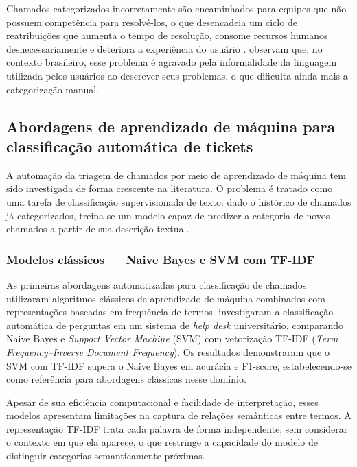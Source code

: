 \documentclass[
    12pt,                %
    openright,           %
    oneside,             %
    a4paper,             %
    english,             %
    brazil               %
]{abntex2}
\begin{document}
Chamados categorizados incorretamente são encaminhados para equipes que não possuem competência para resolvê-los, o que desencadeia um ciclo de reatribuições que aumenta o tempo de resolução, consome recursos humanos desnecessariamente e deteriora a experiência do usuário \cite{harun2023}.  observam que, no contexto brasileiro, esse problema é agravado pela informalidade da linguagem utilizada pelos usuários ao descrever seus problemas, o que dificulta ainda mais a categorização manual.

\subsection{Abordagens de aprendizado de máquina para classificação automática de tickets}
\label{subsec:helpdesk_ml}

A automação da triagem de chamados por meio de aprendizado de máquina tem sido investigada de forma crescente na literatura. O problema é tratado como uma tarefa de classificação supervisionada de texto: dado o histórico de chamados já categorizados, treina-se um modelo capaz de predizer a categoria de novos chamados a partir de sua descrição textual.

\subsubsection{Modelos clássicos — Naive Bayes e SVM com TF-IDF}
\label{subsubsec:helpdesk_classicos}

As primeiras abordagens automatizadas para classificação de chamados utilizaram algoritmos clássicos de aprendizado de máquina combinados com representações baseadas em frequência de termos.  investigaram a classificação automática de perguntas em um sistema de \textit{help desk} universitário, comparando Naive Bayes e \textit{Support Vector Machine} (SVM) com vetorização TF-IDF (\textit{Term Frequency–Inverse Document Frequency}). Os resultados demonstraram que o SVM com TF-IDF supera o Naive Bayes em acurácia e F1-score, estabelecendo-se como referência para abordagens clássicas nesse domínio.

Apesar de sua eficiência computacional e facilidade de interpretação, esses modelos apresentam limitações na captura de relações semânticas entre termos. A representação TF-IDF trata cada palavra de forma independente, sem considerar o contexto em que ela aparece, o que restringe a capacidade do modelo de distinguir categorias semanticamente próximas.
\end{document}
